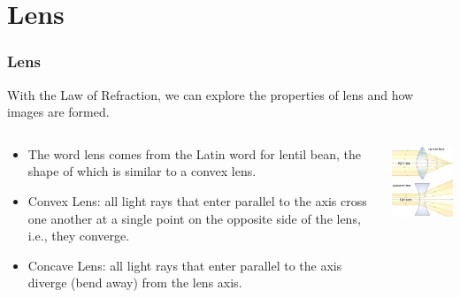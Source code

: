 \documentclass{beamer}
\begin{document}
\section{Lens}

\begin{frame}\frametitle{Lens}
With the Law of Refraction, we can explore the properties of lens and how images are formed.
\begin{columns}
\begin{column}{6.5cm}
\begin{itemize}
\item The word lens comes from the Latin word for lentil bean, the shape of which is similar to a convex lens.
\item Convex Lens: all light rays that enter parallel to the axis cross one another at  a single point on the opposite side of the lens, i.e., they converge.
\item Concave Lens: all light rays that enter parallel to the axis diverge (bend away) from the lens axis.
\end{itemize}
\end{column}
\begin{column}{4.5cm}
\begin{center}
\includegraphics[width=4cm]{fig/cavevex.jpg}
\end{center}
\end{column}
\end{columns}
\end{frame}
\end{document}
